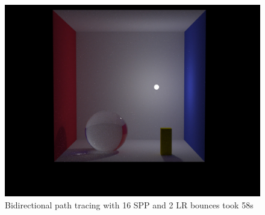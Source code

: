 \begin{figure}[htbp]
  \centering
     \includegraphics[width=\textwidth]{pics/2_bi_dir_pt_16spp_2lrb_58s.jpg}
  \caption{Bidirectional path tracing with 16 SPP and 2 LR bounces took 58s}
  \label{fig:comparison_2_bpt}
\end{figure}
